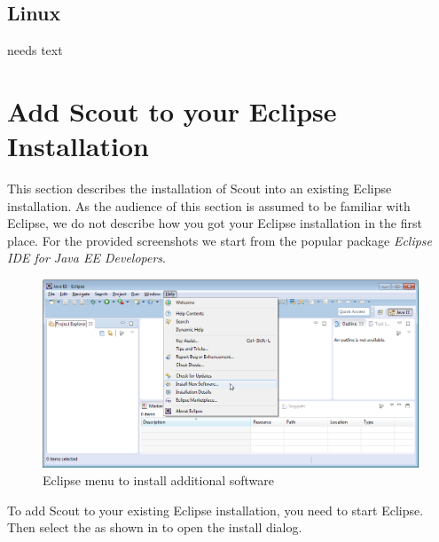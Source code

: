 \documentclass[a4paper,10pt,twoside]{book}
\begin{document}
\subsection{Linux}
needs text

\section{Add Scout to your Eclipse Installation}

This section describes the installation of Scout into an existing Eclipse installation.
As the audience of this section is assumed to be familiar with Eclipse, we do not describe how you got your Eclipse installation in the first place.
For the provided screenshots we start from the popular package \textit{Eclipse IDE for Java EE Developers}.

\begin{figure}
\includegraphics[width=13cm]{eclipse_install_new_software.png}
\caption{Eclipse menu to install additional software}
\end{figure}

To add Scout to your existing Eclipse installation, you need to start Eclipse.
Then select the  as shown in  to open the install dialog.
\end{document}
